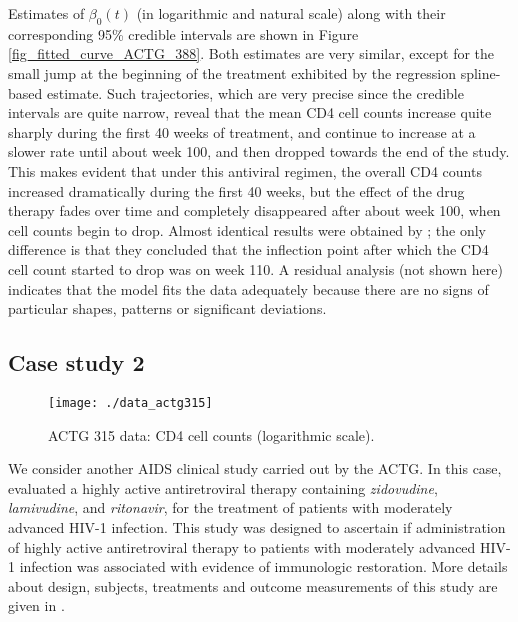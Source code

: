 \documentclass[letterpaper,10pt,openany]{article}
\begin{document}
Estimates of $\beta_0(t)$ (in logarithmic and natural scale) along with their corresponding 95\% credible intervals are shown in Figure \ref{fig_fitted_curve_ACTG_388}. Both estimates are very similar, except for the small jump at the beginning of the treatment exhibited by the regression spline-based estimate. Such trajectories, which are very precise since the credible intervals are quite narrow, reveal that the mean CD4 cell counts increase quite sharply during the first 40 weeks of treatment, and continue to increase at a slower rate until about week 100, and then dropped towards the end of the study. This makes evident that under this antiviral regimen, the overall CD4 counts increased dramatically during the first 40 weeks, but the effect of the drug therapy fades over time and completely disappeared after about week 100, when cell counts begin to drop. 
Almost identical results were obtained by \cite{wu-zhang-06}; the only difference is that they concluded that the inflection point after which the CD4 cell count started to drop was on week 110. A residual analysis (not shown here) indicates that the model
fits the data adequately because there are no signs of particular shapes, patterns or significant deviations.


\subsection{Case study 2} \label{sec_case_study_2}


\begin{figure}[!t]
	\centering
	\texttt{[image: ./data\_actg315]}
	\caption{ACTG 315 data: CD4 cell counts (logarithmic scale).}\label{fig_spaghetti_plot_ACTG_315}
\end{figure}


We consider another AIDS clinical study carried out by the ACTG. In this case, \cite{lederman-98} evaluated a highly active antiretroviral therapy containing \textit{zidovudine}, \textit{lamivudine}, and \textit{ritonavir}, for the treatment of patients with moderately advanced HIV-1 infection. This study was designed to ascertain if administration of highly active antiretroviral therapy to patients with moderately advanced HIV-1 infection was associated with evidence of immunologic restoration. More details about design, subjects, treatments and outcome measurements of this study are given in \cite{lederman-98}.
\end{document}

